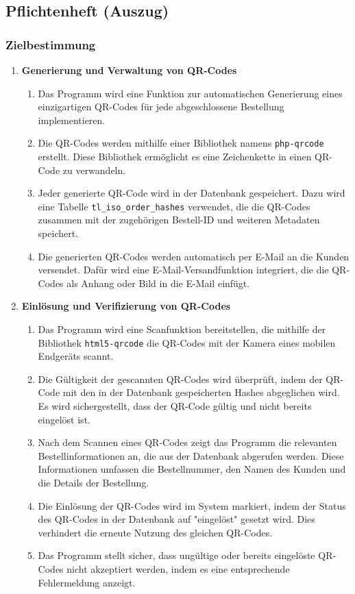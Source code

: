 \subsection{Pflichtenheft (Auszug)}
\label{app:Pflichtenheft}

\subsubsection*{Zielbestimmung}

\begin{enumerate}[itemsep=0em,partopsep=0em,parsep=0em,topsep=0em]
    \item \textbf{Generierung und Verwaltung von QR-Codes}
    \begin{enumerate}
        \item Das Programm wird eine Funktion zur automatischen Generierung eines einzigartigen QR-Codes für jede abgeschlossene Bestellung implementieren.
        \item Die QR-Codes werden mithilfe einer Bibliothek namens \texttt{php-qrcode} erstellt. Diese Bibliothek ermöglicht es eine Zeichenkette in einen QR-Code zu verwandeln.
        \item Jeder generierte QR-Code wird in der Datenbank gespeichert. Dazu wird eine Tabelle \texttt{tl\_iso\_order\_hashes} verwendet, die die QR-Codes zusammen mit der zugehörigen Bestell-ID und weiteren Metadaten speichert.
        \item Die generierten QR-Codes werden automatisch per E-Mail an die Kunden versendet. Dafür wird eine E-Mail-Versandfunktion integriert, die die QR-Codes als Anhang oder Bild in die E-Mail einfügt.
    \end{enumerate}
    
    \item \textbf{Einlösung und Verifizierung von QR-Codes}
    \begin{enumerate}
        \item Das Programm wird eine Scanfunktion bereitstellen, die mithilfe der Bibliothek \texttt{html5-qrcode} die QR-Codes mit der Kamera eines mobilen Endgeräts scannt.
        \item Die Gültigkeit der gescannten QR-Codes wird überprüft, indem der QR-Code mit den in der Datenbank gespeicherten Hashes abgeglichen wird. Es wird sichergestellt, dass der QR-Code gültig und nicht bereits eingelöst ist.
        \item Nach dem Scannen eines QR-Codes zeigt das Programm die relevanten Bestellinformationen an, die aus der Datenbank abgerufen werden. Diese Informationen umfassen die Bestellnummer, den Namen des Kunden und die Details der Bestellung.
        \item Die Einlösung der QR-Codes wird im System markiert, indem der Status des QR-Codes in der Datenbank auf "eingelöst" gesetzt wird. Dies verhindert die erneute Nutzung des gleichen QR-Codes.
        \item Das Programm stellt sicher, dass ungültige oder bereits eingelöste QR-Codes nicht akzeptiert werden, indem es eine entsprechende Fehlermeldung anzeigt.
    \end{enumerate}


\end{enumerate}

